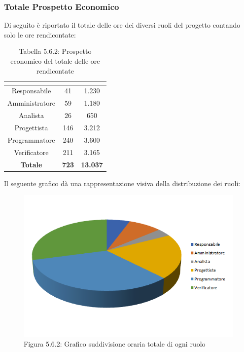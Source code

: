 \subsubsection{Totale Prospetto Economico}
Di seguito è riportato il totale delle ore dei diversi ruoli del progetto contando solo le ore rendicontate:

\renewcommand{\arraystretch}{1.5}
\begin{table}[H]
\begin{center}
\begin{tabular}{|c|c|c|}
\hline
\rowcolor{title_row}
\textbf{\color{title_text}{Ruolo}}  & \textbf{\color{title_text}{Ore}} & \textbf{\color{title_text}{Costo in \euro}} \\ \hline
Responsabile    & 41 & 1.230  \\ \hline
Amministratore  & 59 & 1.180 \\ \hline
Analista        & 26 & 650 \\ \hline
Progettista     & 146 & 3.212 \\ \hline
Programmatore   & 240 & 3.600 \\ \hline
Verificatore    & 211 & 3.165 \\ \hline
\textbf{Totale} & \textbf{723}    & \textbf{13.037}           \\ \hline
\end{tabular}
\caption{Tabella 5.6.2: Prospetto economico del totale delle ore rendicontate\label{}}
\end{center}
\end{table}
\renewcommand{\arraystretch}{1}

Il seguente grafico dà una rappresentazione visiva della distribuzione dei ruoli: \\
\begin{figure} [H]
	\centering
	\includegraphics[scale=1]{Res/ExcelGrafici/Grafici/TotaleRuoli.png}
	\caption{Figura 5.6.2: Grafico suddivisione oraria totale di ogni ruolo}\label{}
\end{figure}


\pagebreak